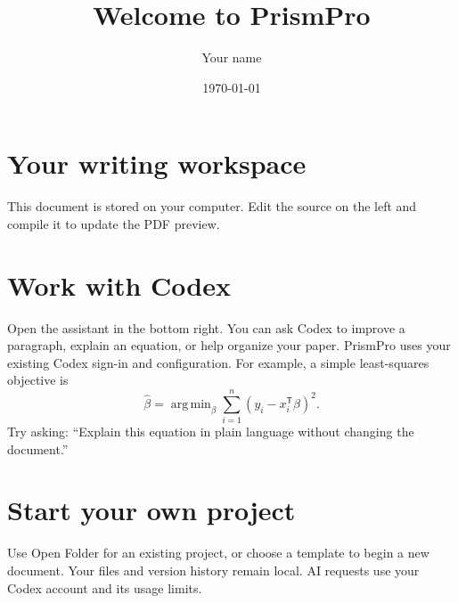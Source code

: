 \documentclass[11pt]{article}
\title{Welcome to PrismPro}
\author{Your name}
\date{\today}
\begin{document}
\maketitle
\section{Your writing workspace}
This document is stored on your computer. Edit the source on the left and compile it to update the PDF preview.
\section{Work with Codex}
Open the assistant in the bottom right. You can ask Codex to improve a paragraph, explain an equation, or help organize your paper. PrismPro uses your existing Codex sign-in and configuration.
For example, a simple least-squares objective is
\begin{equation}
  \hat{\beta}=\mathop{\mathrm{arg\,min}}_{\beta}\sum_{i=1}^{n}(y_i-x_i^{\mathsf{T}}\beta)^2.
\end{equation}
Try asking: ``Explain this equation in plain language without changing the document.''
\section{Start your own project}
Use Open Folder for an existing project, or choose a template to begin a new document. Your files and version history remain local. AI requests use your Codex account and its usage limits.
\end{document}
